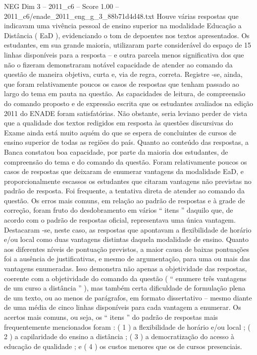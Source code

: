 \begin{textsample}{NEG Dim 3 – 2011\_c6 – Score 1.00 – 2011\_c6/enade\_2011\_eng\_g\_3\_88b71d4d48.txt}
Houve várias respostas que indicavam uma vivência pessoal de ensino superior na modalidade Educação a Distância ( EaD ), evidenciando o tom de depoentes nos textos apresentados.
Os estudantes, em sua grande maioria, utilizaram parte considerável do espaço de 15 linhas disponíveis para a resposta – e outra parcela menos significativa dos que não o fizeram demonstraram notável capacidade de atender ao comando da questão de maneira objetiva, curta e, via de regra, correta.
Registre -se, ainda, que foram relativamente poucos os casos de respostas que tenham passado ao largo do tema em pauta na questão.
As capacidades de leitura, de compreensão do comando proposto e de expressão escrita que os estudantes avaliados na edição 2011 do ENADE foram satisfatórias.
Não obstante, seria leviano perder de vista que a qualidade dos textos redigidos em resposta às questões discursivas do Exame ainda está muito aquém do que se espera de concluintes de cursos de ensino superior de todas as regiões do país.
Quanto ao conteúdo das respostas, a Banca constatou boa capacidade, por parte da maioria dos estudantes, de compreensão do tema e do comando da questão.
Foram relativamente poucos os casos de respostas que deixaram de enumerar vantagens da modalidade EaD, e proporcionalmente escassos os estudantes que citaram vantagens não previstas no padrão de resposta.
Foi frequente, a tentativa direta de atender ao comando da questão.
Os erros mais comuns, em relação ao padrão de respostas e à grade de correção, foram fruto do desdobramento em vários “ itens ” daquilo que, de acordo com o padrão de respostas oficial, representava uma única vantagem.
Destacaram -se, neste caso, as respostas que apontavam a flexibilidade de horário e/ou local como duas vantagens distintas daquela modalidade de ensino.
Quanto aos diferentes níveis de pontuação previstos, a maior causa de baixas pontuações foi a ausência de justificativas, e mesmo de argumentação, para uma ou mais das vantagens enumeradas.
Isso demonstra não apenas a objetividade das respostas, coerente com a objetividade do comando da questão ( “ enumere três vantagens de um curso a distância ” ), mas também certa dificuldade de formulação plena de um texto, ou ao menos de parágrafos, em formato dissertativo – mesmo diante de uma média de cinco linhas disponíveis para cada vantagem a enumerar.
Os acertos mais comuns, ou seja, os “ itens ” do padrão de respostas mais frequentemente mencionados foram : ( 1 ) a flexibilidade de horário e/ou local ; ( 2 ) a capilaridade do ensino a distância ; ( 3 ) a democratização do acesso à educação de qualidade ; e ( 4 ) os custos menores que os de cursos presenciais.

\end{textsample}
